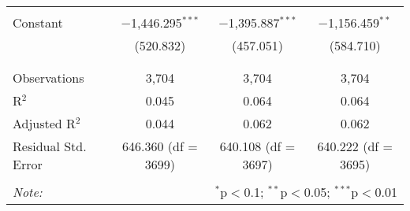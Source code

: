 \begin{table}[!htbp]
\begin{tabular}{@{\extracolsep{5pt}}lccc}
  & & & \\ 
 Constant & $-$1,446.295$^{***}$ & $-$1,395.887$^{***}$ & $-$1,156.459$^{**}$ \\ 
  & (520.832) & (457.051) & (584.710) \\ 
  & & & \\ 
\hline \\[-1.8ex] 
Observations & 3,704 & 3,704 & 3,704 \\ 
R$^{2}$ & 0.045 & 0.064 & 0.064 \\ 
Adjusted R$^{2}$ & 0.044 & 0.062 & 0.062 \\ 
Residual Std. Error & 646.360 (df = 3699) & 640.108 (df = 3697) & 640.222 (df = 3695) \\ 
\hline 
\hline \\[-1.8ex] 
\textit{Note:}  & \multicolumn{3}{r}{$^{*}$p$<$0.1; $^{**}$p$<$0.05; $^{***}$p$<$0.01} \\ 
\end{tabular} 
\end{table} 
